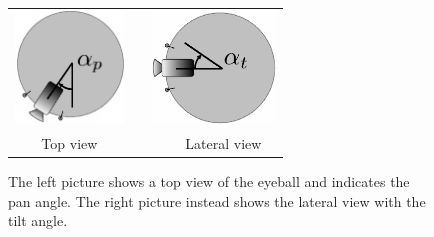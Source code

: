 \begin{figure}
  \vspace{0.5cm}
  \begin{center}
	\begin{tabular}{ccc}
  \parbox{30mm}{\includegraphics[height=30mm]{Figure/EyePan.eps}} & \hspace{2cm} &
  \parbox{30mm}{\includegraphics[height=30mm]{Figure/EyeTilt.eps}}\\
  Top view & \hspace{2cm} & $\quad$ Lateral view
  \end{tabular}
  \end{center}
  \caption{The left picture shows a top view of the eyeball and indicates the pan angle. The right picture instead shows the lateral view with the tilt angle.}
  \label{Fig:EyePanTilt}
\end{figure}

